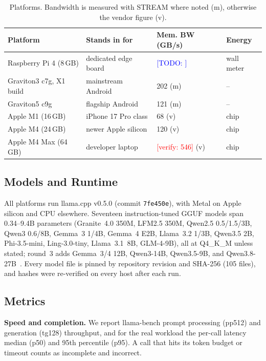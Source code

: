 \documentclass[conference]{IEEEtran}
\newcommand{\verify}[1]{\textcolor{red}{[verify: #1]}}
\newcommand{\todo}[1]{\textcolor{blue}{[TODO: #1]}}
\begin{document}
\begin{table}[t]
\caption{Platforms. Bandwidth is measured with STREAM where noted (m), otherwise the vendor figure (v).}
\label{tab:platforms}
\centering
\small
\begin{tabular}{@{}llll@{}}
\toprule
Platform & Stands in for & Mem. BW (GB/s) & Energy \\
\midrule
Raspberry Pi 4 (8\,GB) & dedicated edge board & \todo{} & wall meter \\
Graviton3 c7g, X1 build & mainstream Android & 202 (m) & -- \\
Graviton5 c9g & flagship Android & 121 (m) & -- \\
Apple M1 (16\,GB) & iPhone 17 Pro class & 68 (v) & chip \\
Apple M4 (24\,GB) & newer Apple silicon & 120 (v) & chip \\
Apple M4 Max (64\,GB) & developer laptop & \verify{546} (v) & chip \\
\bottomrule
\end{tabular}
\end{table}

\subsection{Models and Runtime}

All platforms run llama.cpp v0.5.0 (commit \texttt{7fe450e}), with Metal on Apple silicon and CPU elsewhere. Seventeen instruction-tuned GGUF models span 0.34--9.4B parameters (Granite~4.0 350M, LFM2.5 350M, Qwen2.5 0.5/1.5/3B, Qwen3 0.6/8B, Gemma~3 1/4B, Gemma~4 E2B, Llama~3.2 1/3B, Qwen3.5 2B, Phi-3.5-mini, Ling-3.0-tiny, Llama~3.1~8B, GLM-4-9B), all at Q4\_K\_M unless stated; round~3 adds Gemma~3/4 12B, Qwen3-14B, Qwen3.5-9B, and Qwen3.8-27B~\cite{abdin2024phi3,gemma2025gemma3,yang2025qwen3,grattafiori2024llama3,glm2024chatglm}. Every model file is pinned by repository revision and SHA-256 (105 files), and hashes were re-verified on every host after each run.

\subsection{Metrics}
\label{sec:metrics}

\textbf{Speed and completion.} We report llama-bench prompt processing (pp512) and generation (tg128) throughput, and for the real workload the per-call latency median (p50) and 95th percentile (p95). A call that hits its token budget or timeout counts as incomplete and incorrect.
\end{document}
